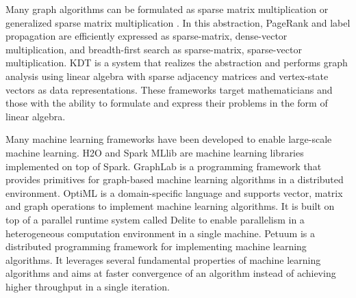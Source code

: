Many graph algorithms can be formulated as sparse matrix multiplication or
generalized sparse matrix multiplication \cite{Mattson13, linear_algebra}.
In this abstraction, PageRank and label propagation are efficiently expressed
as sparse-matrix, dense-vector multiplication, and breadth-first search as 
sparse-matrix, sparse-vector multiplication. KDT \cite{kdt} is a system that
realizes the abstraction and performs graph analysis using linear algebra with
sparse adjacency matrices and vertex-state vectors as data representations.
These frameworks target mathematicians and those with the ability to formulate
and express their problems in the form of linear algebra.

Many machine learning frameworks have been developed to enable large-scale
machine learning. H2O \cite{h2o} and Spark MLlib \cite{mllib} are machine
learning libraries implemented on top of Spark. GraphLab \cite{graphlab} is
a programming framework that provides
primitives for graph-based machine learning algorithms in a distributed
environment. OptiML \cite{optiml} is a domain-specific language and supports
vector, matrix and graph operations to implement machine learning algorithms.
It is built on top of a parallel runtime system called Delite \cite{delite}
to enable parallelism in a heterogeneous computation environment in a single
machine. Petuum \cite{petuum} is a distributed programming framework for
implementing machine learning algorithms. It leverages several fundamental
properties of machine learning algorithms and aims at faster convergence of
an algorithm instead of achieving higher throughput in a single iteration.
